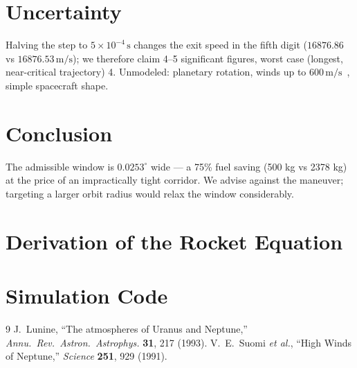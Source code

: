\documentclass[11pt,a4paper]{article}
\numberwithin{equation}{section} %
\newcommand{\unit}[1]{\,\mathrm{#1}}
\begin{document}
\section{Uncertainty}
Halving the step to $5\times10^{-4}\unit{s}$ changes the exit speed in the
fifth digit ($16876.86$ vs $16876.53\unit{m/s}$); we therefore claim 4--5
significant figures, worst case (longest, near-critical trajectory) 4.
Unmodeled: planetary rotation, winds up to $600\unit{m/s}$~\cite{Suomi1991},
simple spacecraft shape.

\section{Conclusion}
The admissible window is $0.0253^\circ$ wide --- a 75\% fuel saving
(500 kg vs 2378 kg) at the price of an impractically tight corridor.
We advise against the maneuver; targeting a larger orbit radius would
relax the window considerably.

\appendix
\section{Derivation of the Rocket Equation}
\section{Simulation Code}

\begin{thebibliography}{9}
 J.~Lunine, ``The atmospheres of Uranus and Neptune,''
  \emph{Annu.\ Rev.\ Astron.\ Astrophys.} \textbf{31}, 217 (1993).
 V.~E.~Suomi \emph{et al.}, ``High Winds of Neptune,''
  \emph{Science} \textbf{251}, 929 (1991).
\end{thebibliography}
\end{document}
